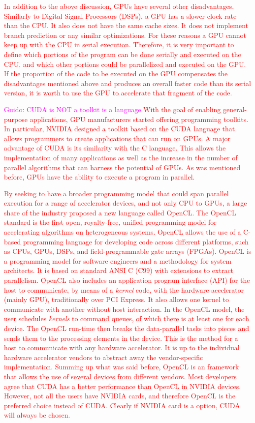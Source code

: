 \documentclass[Ingles]{ic-tese-v1}
\newcommand{\guido}[1]{\noindent\textcolor{magenta}{Guido: {#1}}}
\newcommand{\ed}[1]{\noindent\textcolor{red}{ {#1}}}
\newcommand{\guido}[1]{}
\newcommand{\ed}[1]{}
\newcommand{\tit}[1]{{\textit{#1}}}
\begin{document}
\ed{In addition to the above discussion, GPUs have several other
disadvantages.  Similarly to Digital Signal Processors (DSPs), a GPU has a
slower clock rate than the CPU. It also does not have the same cache sizes. 
It does not implement branch prediction or any similar optimizations. For these
reasons a GPU cannot keep up with the CPU in serial
execution. Therefore, it is very important to define which portions of
the program can be done serially and executed on the CPU, and which other
portions could be parallelized and executed on the GPU. If the proportion of
the code to be executed on the GPU compensates the disadvantages mentioned
above and produces an overall faster code than its serial version, it is worth to use the
GPU to accelerate  that fragment of the code.}

\guido{CUDA is NOT a toolkit is a language}
\ed{With the goal of enabling general-purpose applications, GPU manufacturers
started offering programming  toolkits. In particular, NVIDIA designed a toolkit 
based on the CUDA  language that  allows programmers to create applications 
that can run on GPUs. A major advantage
of CUDA is its similarity with the C language.  This allows the implementation
of many applications as well as the increase in the number of parallel
algorithms that can  harness the potential of GPUs. As was mentioned before, GPUs
have the ability to execute a program in parallel.}

\ed{By seeking to have a  broader  programming model that could  span parallel execution 
for a range of accelerator devices, and not only CPU to GPUs, a large share of
the industry proposed a new language called OpenCL. The OpenCL
standard is the first open, royalty-free, unified programming model for
accelerating algorithms on heterogeneous systems. OpenCL allows the use of a
C-based programming language for developing code across different platforms,
such as CPUs, GPUs, DSPs, and field-programmable gate arrays (FPGAs).  OpenCL
is a programming model for software engineers and a methodology for system
architects. It is based on standard ANSI C (C99) with extensions to extract
parallelism. OpenCL also includes an application program interface (API) for
the host to communicate, by means of a \tit{kernel} code, with the hardware accelerator (mainly GPU),
traditionally over PCI Express. It also allows one kernel to communicate with another
without host interaction.  In the OpenCL model, the user schedules \tit{kernels} to
command queues, of which there is at least one for each device. The OpenCL
run-time then breaks the data-parallel tasks into pieces and sends them to the
processing elements in the device. This is the method for a host to communicate
with any hardware accelerator. It is up to the individual hardware accelerator
vendors to abstract away the vendor-specific implementation.  Summing up what
was said before, OpenCL is an framework that allows the use of several devices
from different vendors. Most developers agree that CUDA has a better
performance than OpenCL in NVIDIA devices. However, not all the users have
NVIDIA cards, and  therefore OpenCL is the preferred choice  instead of CUDA.
Clearly if NVIDIA card is a option, CUDA will always be chosen.}
\end{document}
